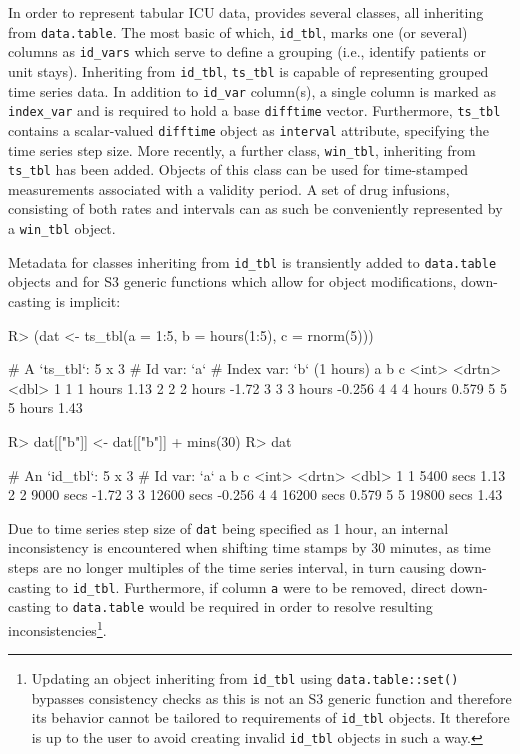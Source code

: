 \documentclass[
  notitle,
  nojss,
  noheadings]{jss}
\begin{document}
In order to represent tabular ICU data,  provides several
classes, all inheriting from \texttt{data.table}. The most basic of
which, \texttt{id\_tbl}, marks one (or several) columns as
\texttt{id\_vars} which serve to define a grouping (i.e., identify
patients or unit stays). Inheriting from \texttt{id\_tbl},
\texttt{ts\_tbl} is capable of representing grouped time series data. In
addition to \texttt{id\_var} column(s), a single column is marked as
\texttt{index\_var} and is required to hold a base 
\texttt{difftime} vector. Furthermore, \texttt{ts\_tbl} contains a
scalar-valued \texttt{difftime} object as \texttt{interval} attribute,
specifying the time series step size. More recently, a further class,
\texttt{win\_tbl}, inheriting from \texttt{ts\_tbl} has been added.
Objects of this class can be used for time-stamped measurements
associated with a validity period. A set of drug infusions, consisting
of both rates and intervals can as such be conveniently represented by a
\texttt{win\_tbl} object.

Metadata for classes inheriting from \texttt{id\_tbl} is transiently
added to \texttt{data.table} objects and for S3 generic functions which
allow for object modifications, down-casting is implicit:

\begin{CodeChunk}
\begin{CodeInput}
R> (dat <- ts_tbl(a = 1:5, b = hours(1:5), c = rnorm(5)))
\end{CodeInput}
\begin{CodeOutput}
# A `ts_tbl`: 5 x 3
# Id var:     `a`
# Index var:  `b` (1 hours)
      a b            c
  <int> <drtn>   <dbl>
1     1 1 hours  1.13
2     2 2 hours -1.72
3     3 3 hours -0.256
4     4 4 hours  0.579
5     5 5 hours  1.43
\end{CodeOutput}
\begin{CodeInput}
R> dat[["b"]] <- dat[["b"]] + mins(30)
R> dat
\end{CodeInput}
\begin{CodeOutput}
# An `id_tbl`: 5 x 3
# Id var:      `a`
      a b               c
  <int> <drtn>      <dbl>
1     1  5400 secs  1.13
2     2  9000 secs -1.72
3     3 12600 secs -0.256
4     4 16200 secs  0.579
5     5 19800 secs  1.43
\end{CodeOutput}
\end{CodeChunk}

Due to time series step size of \texttt{dat} being specified as 1 hour,
an internal inconsistency is encountered when shifting time stamps by 30
minutes, as time steps are no longer multiples of the time series
interval, in turn causing down-casting to \texttt{id\_tbl}. Furthermore,
if column \texttt{a} were to be removed, direct down-casting to
\texttt{data.table} would be required in order to resolve resulting
inconsistencies\footnote{Updating an object inheriting from
  \texttt{id\_tbl} using \texttt{data.table::set()} bypasses consistency
  checks as this is not an S3 generic function and therefore its
  behavior cannot be tailored to requirements of \texttt{id\_tbl}
  objects. It therefore is up to the user to avoid creating invalid
  \texttt{id\_tbl} objects in such a way.}.
\end{document}
